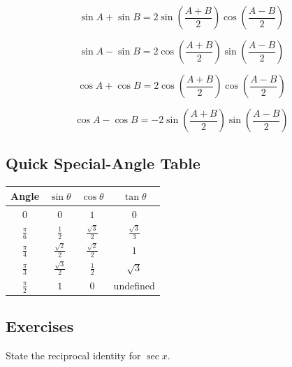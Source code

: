\[
\boxed{
\sin A+\sin B
=
2
\sin\left(\frac{A+B}{2}\right)
\cos\left(\frac{A-B}{2}\right)
}
\]

\[
\boxed{
\sin A-\sin B
=
2
\cos\left(\frac{A+B}{2}\right)
\sin\left(\frac{A-B}{2}\right)
}
\]

\[
\boxed{
\cos A+\cos B
=
2
\cos\left(\frac{A+B}{2}\right)
\cos\left(\frac{A-B}{2}\right)
}
\]

\[
\boxed{
\cos A-\cos B
=
-2
\sin\left(\frac{A+B}{2}\right)
\sin\left(\frac{A-B}{2}\right)
}
\]

\subsection{Quick Special-Angle Table}
\label{subsec:quick-special-angle-table}

\begin{center}
\begin{tabular}{c|c|c|c}
\textbf{Angle}
&
\(\sin\theta\)
&
\(\cos\theta\)
&
\(\tan\theta\)
\\ \hline

\(0\)
&
\(0\)
&
\(1\)
&
\(0\)
\\

\(\frac{\pi}{6}\)
&
\(\frac12\)
&
\(\frac{\sqrt3}{2}\)
&
\(\frac{\sqrt3}{3}\)
\\

\(\frac{\pi}{4}\)
&
\(\frac{\sqrt2}{2}\)
&
\(\frac{\sqrt2}{2}\)
&
\(1\)
\\

\(\frac{\pi}{3}\)
&
\(\frac{\sqrt3}{2}\)
&
\(\frac12\)
&
\(\sqrt3\)
\\

\(\frac{\pi}{2}\)
&
\(1\)
&
\(0\)
&
undefined
\end{tabular}
\end{center}

\subsection{Exercises}
\label{subsec:trigonometric-identities-exercises}

\begin{exercise}[1]
State the reciprocal identity for \(\sec x\).
\end{exercise}


